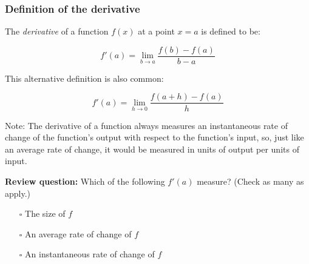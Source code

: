 \documentclass[pdftex, brazil, 12pt, twoside]{article}
\begin{document}
\begin{figure}[H]
  \begin{center}
    \label{fig:derivative-at-point}
  \end{center}
\end{figure}

\subsubsection{Definition of the derivative}
\label{u1-what-definition-of-derivative}

The \emph{derivative} of a function $f(x)$ at a point $x=a$ is defined to be:

\begin{equation}
  f'(a) = \lim_{b \to a}\frac{f(b) - f(a)}{b - a}
\end{equation}

This alternative definition is also common:

\begin{equation}
  f'(a) = \lim_{h \to 0}\frac{f(a + h) - f(a)}{h}
\end{equation}

Note: The derivative of a function always measures an instantaneous rate of change
of the function's output with respect to the function's input, so, just like an
average rate of change, it would be measured in units of output per units of input.

\begin{exercise}
  \textbf{Review question:} Which of the following $f'(a)$ measure?
  (Check as many as apply.)
\begin{itemize}[noitemsep]
\item[$\square$] The size of $f$
\item[$\square$] An average rate of change of $f$
\item[$\square$] An instantaneous rate of change of $f$
\end{itemize}
\end{exercise}
\end{document}
